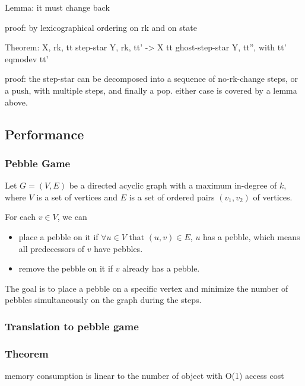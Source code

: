 Lemma: it must change back

proof: by lexicographical ordering on rk and on state

Theorem: X, rk, tt step-star Y, rk, tt' -> X tt ghost-step-star Y, tt'', with tt' eqmodev tt'

proof: the step-star can be decomposed into a sequence of no-rk-change steps, or a push, with multiple steps, and finally a pop. either case is covered by a lemma above.

\subsection{Performance}
\subsubsection{Pebble Game}


Let $G=(V,E)$ be a directed acyclic graph with a maximum in-degree of $k$, where $V$ is a set of vertices and $E$ is a set of ordered pairs $(v_1, v_2)$ of vertices.

For each $v\in V$, we can
\begin{itemize}
    \item place a pebble on it if $\forall u\in V$ that $(u, v)\in E$, $u$ has a pebble, which means all predecessors of $v$ have pebbles.
    \item remove the pebble on it if $v$ already has a pebble.
\end{itemize}

The goal is to place a pebble on a specific vertex and minimize the number of pebbles simultaneously on the graph during the steps.



\subsubsection{Translation to pebble game}
\subsubsection{Theorem}
memory consumption is linear to the number of object with O(1) access cost
